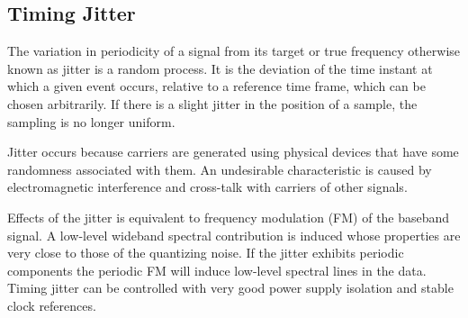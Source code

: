 \subsection*{Timing Jitter}
The variation in periodicity of a signal from its target or true frequency otherwise known as jitter is a
random process. It is the deviation of the time instant at which a given event occurs, relative to a reference time frame, which can be chosen arbitrarily\cite{jitter}.  If there is a slight jitter in
 the position of a sample, the sampling is no longer uniform.

 Jitter occurs because carriers are generated using physical devices that have some randomness associated with them. An undesirable characteristic  is caused by electromagnetic interference and cross-talk with carriers of other signals.
 
 Effects of the jitter is equivalent to frequency modulation (FM) of the
baseband signal. A low-level wideband spectral contribution
 is induced whose properties are very close to those of the quantizing noise. If the  jitter exhibits periodic components the periodic FM will induce low-level spectral lines in the data. Timing jitter can be controlled with very good power supply isolation and stable clock
 references.\cite{AWGN}
 
\pagebreak
